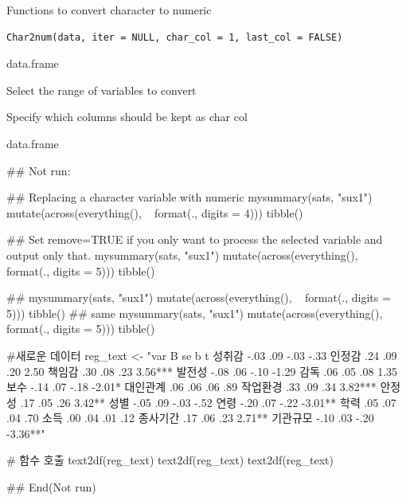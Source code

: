 \documentclass[a4paper]{book}
\begin{document}
%
\begin{Description}
Functions to convert character to numeric
\end{Description}
%
\begin{Usage}
\begin{verbatim}
Char2num(data, iter = NULL, char_col = 1, last_col = FALSE)
\end{verbatim}
\end{Usage}
%
\begin{Arguments}
\begin{ldescription}
\item[\code{data}] data.frame

\item[\code{iter}] Select the range of variables to convert

\item[\code{char\_col}] Specify which columns should be kept as char col
\end{ldescription}
\end{Arguments}
%
\begin{Value}
data.frame
\end{Value}
%
\begin{Examples}
\begin{ExampleCode}

\#\# Not run: 

## Replacing a character variable with numeric
mysummary(sats, "sux1") %
    mutate(across(everything(), ~ format(., digits = 4))) %
    tibble() %


## Set remove=TRUE if you only want to process the selected variable and output only that.
  mysummary(sats, "sux1") %
  mutate(across(everything(), ~ format(., digits = 5))) %
    tibble() %

##
mysummary(sats, "sux1") %
  mutate(across(everything(), ~ format(., digits = 5))) %
    tibble() %
## same
  mysummary(sats, "sux1") %
     mutate(across(everything(), ~ format(., digits = 5))) %
     tibble() %


#새로운 데이터
reg_text <- "var B se b t
성취감 -.03 .09 -.03 -.33
인정감 .24 .09 .20 2.50
책임감 .30 .08 .23 3.56***
발전성 -.08 .06 -.10 -1.29
감독 .06 .05 .08 1.35
보수 -.14 .07 -.18 -2.01*
대인관계 .06 .06 .06 .89
작업환경 .33 .09 .34 3.82***
안정성 .17 .05 .26 3.42**
성별 -.05 .09 -.03 -.52
연령 -.20 .07 -.22 -3.01**
학력 .05 .07 .04 .70
소득 .00 .04 .01 .12
종사기간 .17 .06 .23 2.71**
기관규모 -.10 .03 -.20 -3.36**"

# 함수 호출
text2df(reg_text) %
text2df(reg_text)%
text2df(reg_text)%

## End(Not run)

\end{ExampleCode}
\end{Examples}
\end{document}
